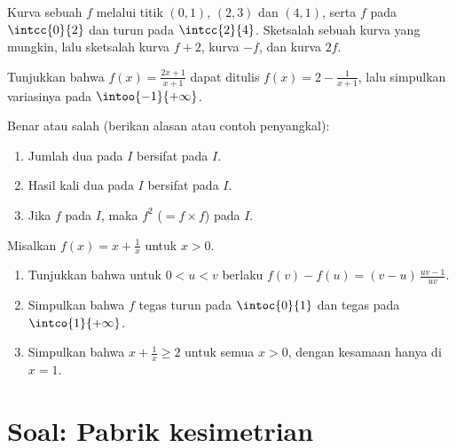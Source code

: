 \begin{exercise}[$\star\star$]\label{exo:g11:func:8}
Kurva sebuah  $f$ melalui titik $(0, 1)$, $(2, 3)$
dan $(4, 1)$, serta $f$  pada $\intcc{0}{2}$ dan turun pada
$\intcc{2}{4}$. Sketsalah sebuah kurva yang mungkin, lalu sketsalah kurva
$f + 2$, kurva $-f$, dan kurva $2f$.
\end{exercise}

\begin{exercise}[$\star\star$]\label{exo:g11:func:9}
Tunjukkan bahwa  $f(x) = \frac{2x+1}{x+1}$ dapat ditulis
$f(x) = 2 - \frac{1}{x+1}$, lalu simpulkan variasinya pada
$\intoo{-1}{+\infty}$.
\end{exercise}

\begin{exercise}[$\star\star$]\label{exo:g11:func:10}
Benar atau salah (berikan alasan atau contoh penyangkal):
\begin{enumerate}
  \item Jumlah dua  pada $I$ bersifat  pada $I$.
  \item Hasil kali dua  pada $I$ bersifat  pada
        $I$.
  \item Jika $f$  pada $I$, maka $f^2$ ($= f \times f$) 
        pada $I$.
\end{enumerate}
\end{exercise}

\begin{exercise}[$\star\star\star$]\label{exo:g11:func:11}
Misalkan $f(x) = x + \frac{1}{x}$ untuk $x > 0$.
\begin{enumerate}
  \item Tunjukkan bahwa untuk $0 < u < v$ berlaku
        $f(v) - f(u) = (v - u)\,\frac{uv - 1}{uv}$.
  \item Simpulkan bahwa $f$ tegas turun pada $\intoc{0}{1}$ dan
        tegas  pada $\intco{1}{+\infty}$.
  \item Simpulkan bahwa $x + \frac1x \geq 2$ untuk semua $x > 0$, dengan
        kesamaan hanya di $x = 1$.
\end{enumerate}
\end{exercise}

\section{Soal: Pabrik kesimetrian}

